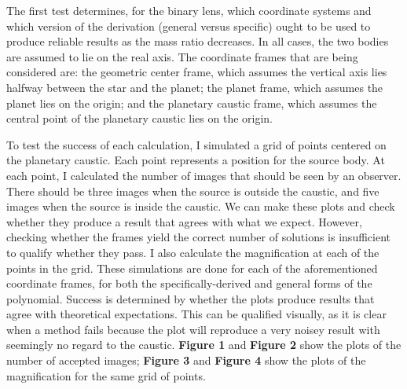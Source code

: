 \documentclass{article}
\begin{document}

The first test determines, for the binary lens, which coordinate systems
and which version of the derivation (general versus specific) ought to be
used to produce reliable results as the mass ratio decreases. In all cases,
the two bodies are assumed to lie on the real axis. The coordinate frames
that are being considered are: the geometric center frame, which assumes
the vertical axis lies halfway between the star and the planet; the planet
frame, which assumes the planet lies on the origin; and the planetary
caustic frame, which assumes the central point of the planetary caustic
lies on the origin. 

To test the success of each calculation, I simulated a grid of points
centered on the planetary caustic. Each point represents a position
for the source body. At each point, I calculated the number of images
that should be seen by an observer. There should be three images when
the source is outside the caustic, and five images when the source is
inside the caustic. We can make these plots and check whether they
produce a result that agrees with what we expect. However, checking whether
the frames yield the correct number of solutions is insufficient to qualify
whether they pass. I also calculate the magnification at each of the
points in the grid. These simulations are done for each  of the
aforementioned coordinate frames, for both the specifically-derived and
general forms of the polynomial. Success is determined by whether the
plots produce results that agree with theoretical expectations. This can
be qualified visually, as it is clear when a method fails because the
plot will reproduce a very noisey result with seemingly no regard to the
caustic. \textbf{Figure 1} and \textbf{Figure 2} show the plots of the
number of accepted images; \textbf{Figure 3} and \textbf{Figure 4} show
the plots of the magnification for the same grid of points.
\end{document}
